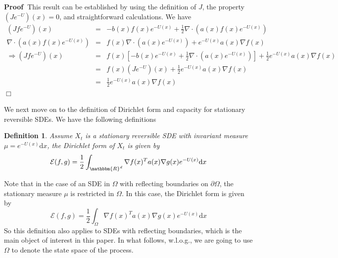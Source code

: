 \documentclass[english, aip, jcp, priprint, graphicx,floatfix]{revtex4-1}
\newtheorem{definition}{Definition}
\theoremstyle{plain}
\theoremstyle{definition}
\theoremstyle{plain}
\begin{document}
\noindent\textbf{Proof\ }This result can be established by using the
definition of $J$, the property $(J e^{- U })(x) = 0$, and straightforward
calculations. We have
\begin{eqnarray*}
(J f e^{- U })(x) & = & - b (x) f (x) e^{- U (x)} + \frac{1}{2} \nabla
\cdot (a (x) f (x) e^{- U (x)})\\
\nabla \cdot (a (x) f (x) e^{- U (x)}) & = & f (x) \nabla \cdot (a (x) e^{-
U (x)}) + e^{- U (x)} a (x) \nabla f (x)\\
\Longrightarrow (J f e^{- U })(x) & = & f (x) \left[ - b (x) e^{- U (x)}
+ \frac{1}{2} \nabla \cdot (a (x) e^{- U (x)}) \right] + \frac{1}{2} e^{- U
(x)} a (x) \nabla f (x)\\
& = & f (x) (J e^{- U })(x) + \frac{1}{2} e^{- U (x)} a (x) \nabla f (x)\\
& = & \frac{1}{2} e^{- U (x)} a (x) \nabla f (x)
\end{eqnarray*}\hspace*{\fill}$\Box$\medskip

We next move on to the definition of Dirichlet form and capacity for
stationary reversible SDEs. We have the following definitions

\begin{definition}
Assume $X_t$ is a stationary reversible SDE with invariant measure
${\mu}= e^{- U (x)} \mathrm{d} x$, the Dirichlet form of $X_t$ is given
by
\[ \mathcal{E} (f, g) = \frac{1}{2} \int_{\mathbbm{R}^d} \nabla f (x)^T a
(x) \nabla g (x) e^{- U (x)} \mathrm{d} x \]
\end{definition}

Note that in the case of an SDE in $\Omega$ with reflecting boundaries on
$\partial \Omega$, the stationary measure ${\mu}$ is restricted in
$\Omega$. In this case, the Dirichlet form is given by
\[ \mathcal{E} (f, g) = \frac{1}{2} \int_{\Omega} \nabla f (x)^T a (x) \nabla
g (x) e^{- U (x)} \mathrm{d} x \]
So this definition also applies to SDEs with reflecting boundaries, which is
the main object of interest in this paper. In what follows, w.l.o.g., we are
going to use $\Omega$ to denote the state space of the process.
\end{document}
